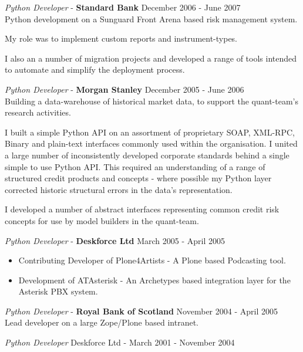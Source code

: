 \documentclass[margin, 10pt]{res} %
\begin{document}
\begin{resume}
        {\sl Python Developer} - \textbf{Standard Bank} \hfill December 2006 - June 2007\\

        Python development on a Sunguard Front Arena based risk management system.

        My role was to implement custom reports and instrument-types.

        I also an a number of migration projects and developed a range of tools intended to automate and simplify the deployment process.

        {\sl Python Developer} - \textbf{Morgan Stanley} \hfill December 2005 - June 2006\\


        Building a data-warehouse of historical market data, to support the quant-team's research activities.

        I built a simple Python API on an assortment of proprietary SOAP, XML-RPC, Binary and plain-text interfaces commonly used within the organisation. I united a large number of inconsistently developed corporate standards behind a single simple to use Python API. This required an understanding of a range of structured credit products and concepts - where possible my Python layer corrected historic structural errors in the data's representation.

        I developed a number of abstract interfaces representing common credit risk concepts for use by model builders in the quant-team.

        {\sl Python Developer} - \textbf{Deskforce Ltd} \hfill March 2005 - April 2005\\

        \begin{itemize}
            \item Contributing Developer of Plone4Artists - A Plone based Podcasting tool.
            \item Development of ATAsterisk - An Archetypes based integration layer for the Asterisk PBX system.
        \end{itemize}

        {\sl Python Developer} - \textbf{Royal Bank of Scotland} \hfill November 2004 - April 2005\\

        Lead developer on a large Zope/Plone based intranet.

        {\sl Python Developer} \hfill Deskforce Ltd - March 2001 - November 2004\\


\end{resume}
\end{document}
